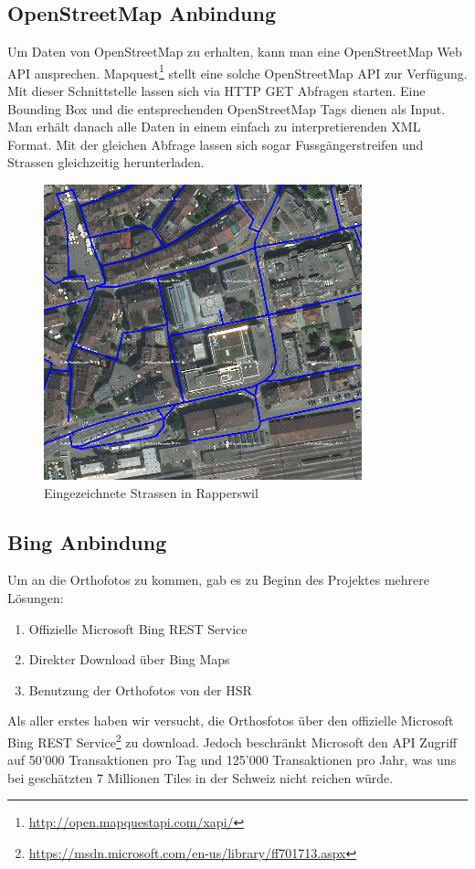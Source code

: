 \subsection{OpenStreetMap Anbindung}
Um Daten von OpenStreetMap zu erhalten, kann man eine OpenStreetMap Web API ansprechen. Mapquest\footnote{\url{http://open.mapquestapi.com/xapi/}} stellt eine solche OpenStreetMap API zur Verfügung. Mit dieser Schnittstelle lassen sich via HTTP GET Abfragen starten. Eine Bounding Box und die entsprechenden OpenStreetMap Tags dienen als Input. Man erhält danach alle Daten in einem einfach zu interpretierenden XML Format. Mit der gleichen Abfrage lassen sich sogar Fussgängerstreifen und Strassen gleichzeitig herunterladen.

\begin{figure}[H]
	\centering
	\includegraphics{images/Strassen_Rapperswil.png}
	\caption{Eingezeichnete Strassen in Rapperswil}
\end{figure}

\newpage
\subsection{Bing Anbindung}
Um an die Orthofotos zu kommen, gab es zu Beginn des Projektes mehrere Lösungen:
\begin{enumerate}
	\item Offizielle Microsoft Bing REST Service
	\item Direkter Download über Bing Maps
	\item Benutzung der Orthofotos von der HSR
\end{enumerate}

Als aller erstes haben wir versucht, die Orthosfotos über den offizielle Microsoft Bing REST Service\footnote{\url{https://msdn.microsoft.com/en-us/library/ff701713.aspx}} zu download. Jedoch beschränkt Microsoft den API Zugriff auf 50'000 Transaktionen pro Tag und 125'000 Transaktionen pro Jahr, was uns bei geschätzten 7 Millionen Tiles in der Schweiz nicht reichen würde.

